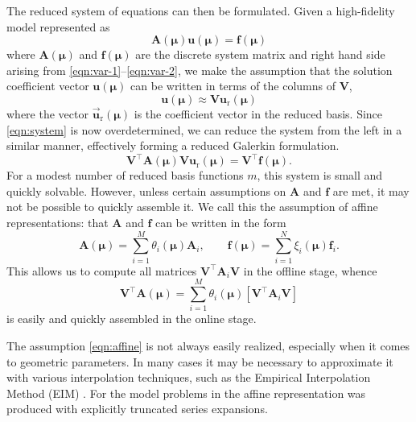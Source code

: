 \documentclass[a4paper]{jpconf}
\begin{document}
The reduced system of equations can then be formulated. Given a
high-fidelity model represented as
\begin{equation}
  \bm A(\bm \mu) \bm u(\bm \mu) = \bm f(\bm \mu)
  \label{eqn:system}
\end{equation}
where $\bm A(\bm \mu)$ and $\bm f(\bm \mu)$ are the discrete
system matrix and right hand side arising from
\eqref{eqn:var-1}--\eqref{eqn:var-2}, we make the assumption that the
solution coefficient vector $\bm u(\bm \mu)$ can be written in
terms of the columns of $\bm V$,
\begin{equation}
  \bm u(\bm \mu) \approx \bm V \bm u_\text{r}(\bm \mu)
\end{equation}
where the vector $\vec{\bm u}_\text{r}(\bm \mu)$ is the coefficient
vector in the reduced basis. Since \eqref{eqn:system} is now
overdetermined, we can reduce the system from the left in a similar
manner, effectively forming a reduced Galerkin formulation.
\begin{equation}
  \bm V^\intercal \bm A(\bm \mu) \bm V \bm u_\text{r}(\bm \mu) = \bm V^\intercal \bm f(\bm \mu).
  \label{eqn:rsystem}
\end{equation}
For a modest number of reduced basis functions $m$, this system is
small and quickly solvable.  However, unless certain assumptions on
$\bm A$ and $\bm f$ are met, it may not be possible to quickly
assemble it.  We call this the assumption of affine representations:
that $\bm A$ and $\bm f$ can be written in the form
\begin{equation}
  \bm A(\bm \mu) = \sum_{i=1}^{M} \theta_i(\bm \mu) \bm A_i, \qquad
  \bm f(\bm \mu) = \sum_{i=1}^{N} \xi_i(\bm \mu) \bm f_i.
  \label{eqn:affine}
\end{equation}
This allows us to compute all matrices $\bm V^\intercal \bm A_i \bm V$
in the offline stage, whence
\begin{equation}
  \bm V^\intercal \bm A(\bm \mu) = \sum_{i=1}^{M} \theta_i(\bm \mu)
  \left[ \bm V^\intercal \bm A_i \bm V \right]
\end{equation}
is easily and quickly assembled in the online stage.

The assumption \eqref{eqn:affine} is not always easily realized,
especially when it comes to geometric parameters.  In many cases it
may be necessary to approximate it with various interpolation
techniques, such as the Empirical Interpolation Method (EIM)
\cite{Quarteroni2016rbm}.  For the model problems in
\cite{Fonn2018fdc} the affine representation was produced with
explicitly truncated series expansions.
\end{document}
